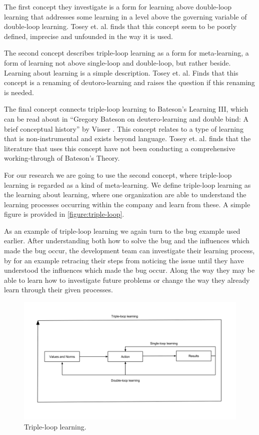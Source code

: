 The first concept they investigate is a form for learning above double-loop learning that addresses some learning in a level above the governing variable of double-loop learning. Tosey et. al. finds that this concept seem to be poorly defined, imprecise and unfounded in the way it is used. 

The second concept describes triple-loop learning as a form for meta-learning, a form of learning not above single-loop and double-loop, but rather beside. Learning about learning is a simple description. Tosey et. al. Finds that this concept is a renaming of deutoro-learning and raises the question if this renaming is needed. 

The final concept connects triple-loop learning to Bateson's Learning III, which can be read about in ``Gregory Bateson on deutero-learning and double bind: A brief conceptual history'' by Visser \cite{Visser2003}. This concept relates to a type of learning that is non-instrumental and exists beyond language. Tosey et. al. finds that the literature that uses this concept have not been conducting a comprehensive working-through of Bateson's Theory. 

For our research we are going to use the second concept, where triple-loop learning is regarded as a kind of meta-learning. We define triple-loop learning as the learning about learning, where one organization are able to understand the learning processes occurring within the company and learn from these. A simple figure is provided in \autoref{figure:triple-loop}.

As an example of triple-loop learning we again turn to the bug example used earlier. After understanding both how to solve the bug and the influences which made the bug occur, the development team can investigate their learning process, by for an example retracing their steps from noticing the issue until they have understood the influences which made the bug occur. Along the way they may be able to learn how to investigate future problems or change the way they already learn through their given processes. 

\begin{figure}[!h]
	\centering
	\includegraphics[width=\textwidth, keepaspectratio]{figures/triple-loop.png}
	\caption{Triple-loop learning.}
	\label{figure:triple-loop}
\end{figure}

